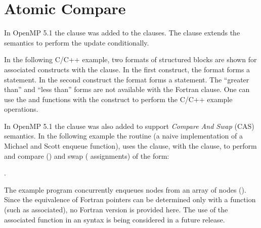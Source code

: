 \section{Atomic Compare}
\label{sec:cas}


In OpenMP 5.1 the  clause was added to the  clauses.
The  clause extends the semantics to perform the 
update conditionally. 

In the following C/C++ example, two formats of structured blocks
are shown for associated  constructs with the  clause.
In the first  construct, the format forms a  statement.
In the second  construct the format forms a  statement.
The ``greater than'' and ``less than'' forms are not available with the Fortran 
clause.  One can use the  and  functions with the 
construct to perform the C/C++ example operations.


In OpenMP 5.1 the  clause was also added to support \emph{Compare And
Swap} (CAS) semantics. In the following example the  routine
(a naive implementation of a Michael and Scott enqueue function), uses the
 clause, with the  clause, to perform and compare
() and swap ( assignments) of the
form: 
\begin{description}[noitemsep,labelindent=5mm,widest=f90]
\item {}.
\end{description}
The example program concurrently enqueues nodes from an array of nodes ().
Since the equivalence of Fortran pointers can be determined only with a function (such as associated),
no Fortran version is provided here. The use of the associated function in an  syntax is
being considered in a future release.

